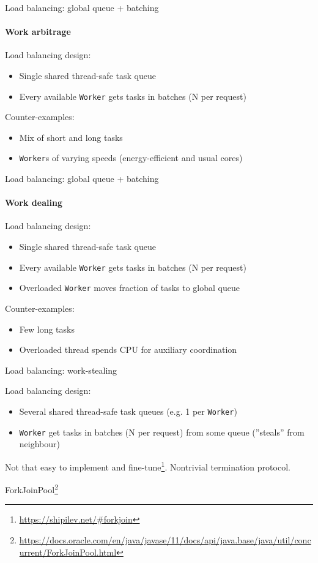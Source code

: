 \begin{frame}{Load balancing: global queue + batching}
\framesubtitle{Work arbitrage}

Load balancing design:
\begin{itemize}
    \item Single shared thread-safe task queue
    \item Every available \texttt{Worker} gets tasks in batches (N per request)
\end{itemize}

Counter-examples:
\begin{itemize}
    \item Mix of short and long tasks
    \item \texttt{Worker}s of varying speeds (energy-efficient and usual cores)
\end{itemize}

\end{frame}


\begin{frame}{Load balancing: global queue + batching}
\framesubtitle{Work dealing}

Load balancing design:
\begin{itemize}
    \item Single shared thread-safe task queue
    \item Every available \texttt{Worker} gets tasks in batches (N per request)
    \item Overloaded \texttt{Worker} moves fraction of tasks to global queue
\end{itemize}

Counter-examples:
\begin{itemize}
    \item Few long tasks
    \item Overloaded thread spends CPU for auxiliary coordination
\end{itemize}
\end{frame}

\begin{frame}{Load balancing: work-stealing}

Load balancing design:
\begin{itemize}
    \item Several shared thread-safe task queues (e.g. 1 per \texttt{Worker})
    \item \texttt{Worker} get tasks in batches (N per request) from some queue (''steals'' from neighbour)

\end{itemize}

Not that easy to implement and fine-tune\footnote{\tiny\url{https://shipilev.net/#forkjoin}}. Nontrivial termination protocol.

ForkJoinPool\footnote{\tiny\url{https://docs.oracle.com/en/java/javase/11/docs/api/java.base/java/util/concurrent/ForkJoinPool.html}}

\end{frame}


